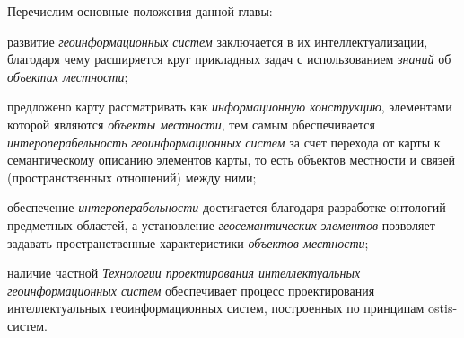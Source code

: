 Перечислим основные положения данной главы:
\begin{textitemize}
	\item развитие \textit{геоинформационных систем} заключается в их интеллектуализации, благодаря чему расширяется круг прикладных задач с использованием \textit{знаний} об \textit{объектах местности};   
	\item предложено карту рассматривать как \textit{информационную конструкцию}, элементами которой являются \textit{объекты местности}, тем самым обеспечивается \textit{интероперабельность} \textit{геоинформационных систем} за счет перехода от карты к семантическому описанию элементов карты, то есть объектов местности и связей (пространственных отношений) между ними;
	\item обеспечение \textit{интероперабельности} достигается благодаря разработке онтологий предметных областей, а установление \textit{геосемантических элементов} позволяет задавать пространственные характеристики \textit{объектов местности}; 
	\item наличие частной \textit{Технологии проектирования интеллектуальных геоинформационных систем} обеспечивает процесс проектирования интеллектуальных геоинформационных систем, построенных по принципам ostis-систем.
\end{textitemize}